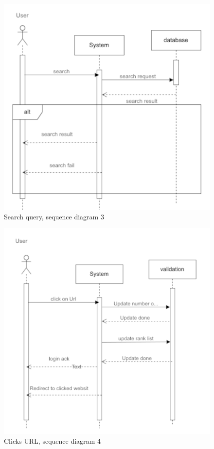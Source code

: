 \documentclass{scrartcl}
\begin{document}
\begin{figure}[H]
  \begin{center}
    \caption{Search query, sequence diagram 3}
    \includegraphics[scale=0.65]{seq-diagram-3.png}
  \end{center}
\end{figure}

\begin{figure}[H]
  \begin{center}
    \caption{Clicks URL, sequence diagram 4}
    \includegraphics[scale=0.7]{seq-diagram-4.png}
  \end{center}
\end{figure}
\end{document}

